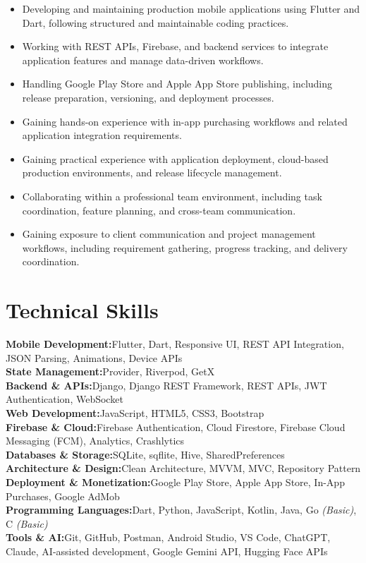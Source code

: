\documentclass[10.5pt, a4paper]{article}
\newcommand{\skillrow}[2]{%
  {\textbf{\color{cnavy}#1:}}\enskip\small #2 \\[3pt]%
}
\begin{document}
\vspace{4pt}

\begin{itemize}
  \item Developing and maintaining production mobile applications using Flutter and Dart, following structured and maintainable coding practices.
  \item Working with REST APIs, Firebase, and backend services to integrate application features and manage data-driven workflows.
  \item Handling Google Play Store and Apple App Store publishing, including release preparation, versioning, and deployment processes.
  \item Gaining hands-on experience with in-app purchasing workflows and related application integration requirements.
  \item Gaining practical experience with application deployment, cloud-based production environments, and release lifecycle management.
  \item Collaborating within a professional team environment, including task coordination, feature planning, and cross-team communication.
  \item Gaining exposure to client communication and project management workflows, including requirement gathering, progress tracking, and delivery coordination.
\end{itemize}

\section{Technical Skills}

\vspace{2pt}
\skillrow{Mobile Development}{Flutter, Dart, Responsive UI, REST API Integration, JSON Parsing, Animations, Device APIs}
\skillrow{State Management}{Provider, Riverpod, GetX}
\skillrow{Backend \& APIs}{Django, Django REST Framework, REST APIs, JWT Authentication, WebSocket}
\skillrow{Web Development}{JavaScript, HTML5, CSS3, Bootstrap}
\skillrow{Firebase \& Cloud}{Firebase Authentication, Cloud Firestore, Firebase Cloud Messaging (FCM), Analytics, Crashlytics}
\skillrow{Databases \& Storage}{SQLite, sqflite, Hive, SharedPreferences}
\skillrow{Architecture \& Design}{Clean Architecture, MVVM, MVC, Repository Pattern}
\skillrow{Deployment \& Monetization}{Google Play Store, Apple App Store, In-App Purchases, Google AdMob}
\skillrow{Programming Languages}{Dart, Python, JavaScript, Kotlin, Java, Go \textit{(Basic)}, C \textit{(Basic)}}
\skillrow{Tools \& AI}{Git, GitHub, Postman, Android Studio, VS Code, ChatGPT, Claude, AI-assisted development, Google Gemini API, Hugging Face APIs}
\end{document}
